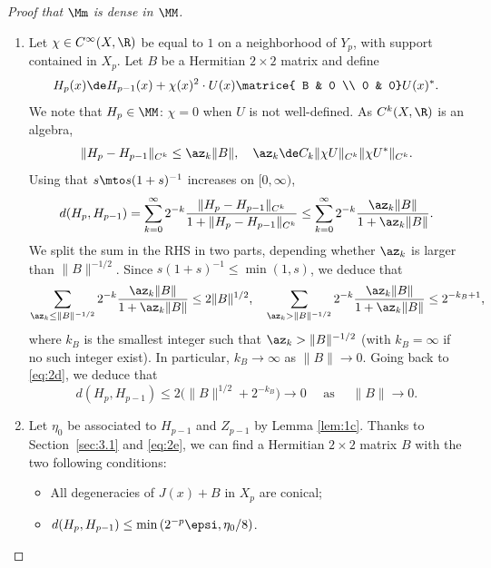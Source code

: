 \begin{proof}[Proof that $\Mm$ is dense in $\MM$]
\begin{enumerate}
\item
Let $\chi \in C^\infty(X,\R)$ be equal to $1$ on a neighborhood of $Y_p$, with support contained in $X_p$. Let $B$ be a Hermitian $2 \times 2$ matrix and define
\begin{equation}\label{eq:1r}
H_p(x) \de H_{p-1}(x) + \chi(x)^2 \cdot U(x) \matrice{ B & 0 \\ 0 & 0}U(x)^*.
\end{equation}
We note that
$H_p \in \MM$: $\chi = 0$ when $U$ is not well-defined. As $C^k(X,\R)$ is an algebra,
\begin{equation*}
\| H_p-H_{p-1} \|_{C^k} \leq \az_k \|B\|, \quad \az_k \de C_k \| \chi U \|_{C^k} \| \chi U^* \|_{C^k}.
\end{equation*}
Using that $s \mto s(1+s)^{-1}$ increases on $[0,\infty)$,
\begin{equation}\label{eq:2d}
d(H_p,H_{p-1}) = \sum_{k=0}^\infty 2^{-k} \dfrac{\| H_p-H_{p-1} \|_{C^k} }{1+\| H_p - H_{p-1}\|_{C^k}} \leq \sum_{k=0}^\infty 2^{-k} \dfrac{\az_k \|B\| }{1+\az_k \|B\|}.
\end{equation}
We split the sum in the RHS in two parts, depending whether $\az_k$ is larger than $\|B\|^{-1/2}$. Since $s(1+s)^{-1} \leq \min(1,s)$, we deduce that
\begin{equation*}
\sum_{\az_k \leq \|B\|^{-1/2} } 2^{-k} \dfrac{\az_k \|B\| }{1+\az_k \|B\|} \leq 2\|B\|^{1/2}, \quad \sum_{\az_k > \|B\|^{-1/2} } 2^{-k} \dfrac{\az_k \|B\| }{1+\az_k \|B\|} \leq 2^{-k_B+1},
\end{equation*}
where $k_B$ is the smallest integer such that $\az_k > \| B \|^{-1/2}$ (with $k_B = \infty$ if no such integer exist). In particular, $k_B \to \infty$ as $\| B \| \to 0$. Going back to \eqref{eq:2d}, we deduce that
\begin{equation}\label{eq:2e}
d(H_p,H_{p-1}) \leq 2 \bigl(\| B \|^{1/2} + 2^{-k_B}\bigr) \to 0 \quad \text{ as } \quad \| B \| \to 0.
\end{equation}

\item
Let $\eta_0$ be associated to $H_{p-1}$ and $Z_{p-1}$ by Lemma \ref{lem:1c}.
Thanks to Section~\ref{sec:3.1} and \eqref{eq:2e}, we can find a Hermitian $2 \times 2$ matrix $B$ with the two following conditions:
\begin{itemize}
\item All degeneracies of $J(x) + B$ in $X_p$ are conical;
\item $d(H_p,H_{p-1}) \leq \min\left(2^{-p} \epsi,\eta_0/8\right)$.
\end{itemize}


\end{enumerate}
\end{proof}
